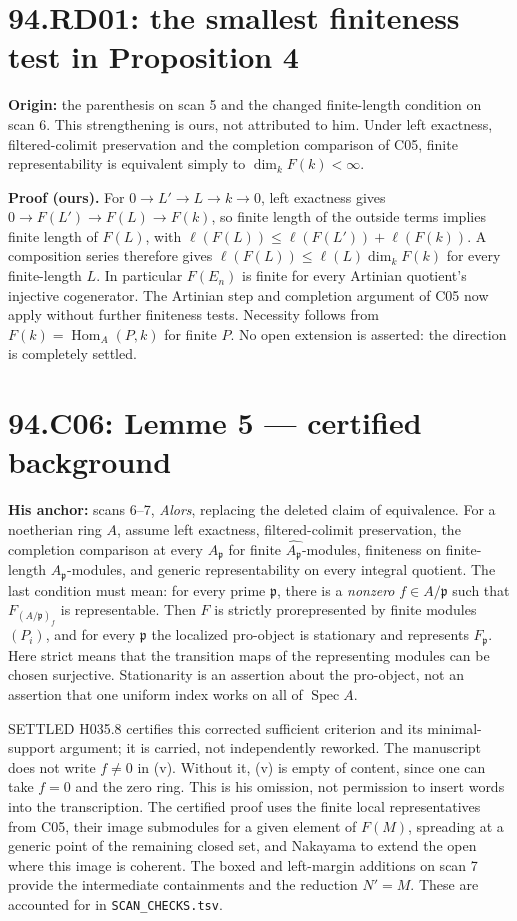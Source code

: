 \documentclass[11pt]{article}
\newcommand{\Hom}{\operatorname{Hom}}
\newcommand{\Spec}{\operatorname{Spec}}
\newcommand{\p}{\mathfrak p}
\begin{document}
\section{94.RD01: the smallest finiteness test in Proposition 4}
\label{RD01}
\textbf{Origin:} the parenthesis on scan 5 and the changed finite-length
condition on scan 6. This strengthening is ours, not attributed to him.
Under left exactness, filtered-colimit preservation and the completion
comparison of C05, finite representability is equivalent simply to
$\dim_k F(k)<\infty$.

\textbf{Proof (ours).}
For $0\to L'\to L\to k\to0$, left exactness gives
$0\to F(L')\to F(L)\to F(k)$, so finite length of the outside terms
implies finite length of $F(L)$, with
$\ell(F(L))\leq\ell(F(L'))+\ell(F(k))$.
A composition series therefore gives
$\ell(F(L))\leq\ell(L)\dim_k F(k)$ for every finite-length $L$.
In particular $F(E_n)$ is finite for every Artinian quotient's
injective cogenerator. The Artinian step and completion argument of
C05 now apply without further finiteness tests. Necessity follows
from $F(k)=\Hom_A(P,k)$ for finite $P$.
No open extension is asserted: the direction is completely settled.

\section{94.C06: Lemme 5 --- certified background}
\label{C06}
\textbf{His anchor:} scans 6--7, \emph{Alors}, replacing the deleted
claim of equivalence. For a noetherian ring $A$, assume left exactness,
filtered-colimit preservation, the completion comparison at every
$A_\p$ for finite $\widehat{A_\p}$-modules, finiteness on finite-length
$A_\p$-modules, and generic representability on every integral quotient.
The last condition must mean: for every prime $\p$, there is a
\emph{nonzero} $f\in A/\p$ such that $F_{(A/\p)_f}$ is representable.
Then $F$ is strictly prorepresented by finite modules $(P_i)$, and
for every $\p$ the localized pro-object is stationary and represents
$F_\p$. Here strict means that the transition maps of the representing
modules can be chosen surjective. Stationarity is an assertion about
the pro-object, not an assertion that one uniform index works on all
of $\Spec A$.

SETTLED H035.8 certifies this corrected sufficient criterion and its
minimal-support argument; it is carried, not independently reworked.
The manuscript does not write $f\ne0$ in (v). Without it, (v) is empty
of content, since one can take $f=0$ and the zero ring. This is his
omission, not permission to insert words into the transcription.
The certified proof uses the finite local representatives from C05,
their image submodules for a given element of $F(M)$, spreading at a
generic point of the remaining closed set, and Nakayama to extend the
open where this image is coherent. The boxed and left-margin additions
on scan 7 provide the intermediate containments and the reduction
$N'=M$. These are accounted for in \texttt{SCAN\_CHECKS.tsv}.
\end{document}
